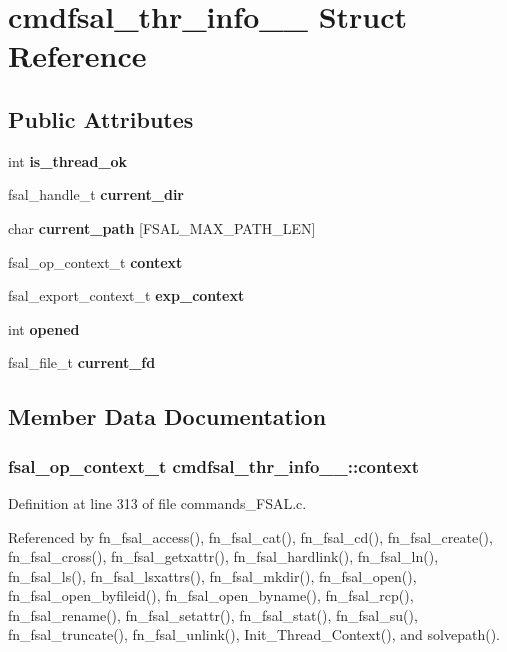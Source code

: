 \section{cmdfsal\_\-thr\_\-info\_\-\_\- Struct Reference}
\label{structcmdfsal__thr__info____}
\subsection*{Public Attributes}
\begin{CompactItemize}
\item 
int {\bf is\_\-thread\_\-ok}
\item 
fsal\_\-handle\_\-t {\bf current\_\-dir}
\item 
char {\bf current\_\-path} [FSAL\_\-MAX\_\-PATH\_\-LEN]
\item 
fsal\_\-op\_\-context\_\-t {\bf context}
\item 
fsal\_\-export\_\-context\_\-t {\bf exp\_\-context}
\item 
int {\bf opened}
\item 
fsal\_\-file\_\-t {\bf current\_\-fd}
\end{CompactItemize}


\subsection{Member Data Documentation}
\subsubsection{\setlength{\rightskip}{0pt plus 5cm}fsal\_\-op\_\-context\_\-t {\bf cmdfsal\_\-thr\_\-info\_\-\_\-::context}}\label{structcmdfsal__thr__info_____o3}




Definition at line 313 of file commands\_\-FSAL.c.

Referenced by fn\_\-fsal\_\-access(), fn\_\-fsal\_\-cat(), fn\_\-fsal\_\-cd(), fn\_\-fsal\_\-create(), fn\_\-fsal\_\-cross(), fn\_\-fsal\_\-getxattr(), fn\_\-fsal\_\-hardlink(), fn\_\-fsal\_\-ln(), fn\_\-fsal\_\-ls(), fn\_\-fsal\_\-lsxattrs(), fn\_\-fsal\_\-mkdir(), fn\_\-fsal\_\-open(), fn\_\-fsal\_\-open\_\-byfileid(), fn\_\-fsal\_\-open\_\-byname(), fn\_\-fsal\_\-rcp(), fn\_\-fsal\_\-rename(), fn\_\-fsal\_\-setattr(), fn\_\-fsal\_\-stat(), fn\_\-fsal\_\-su(), fn\_\-fsal\_\-truncate(), fn\_\-fsal\_\-unlink(), Init\_\-Thread\_\-Context(), and solvepath().
